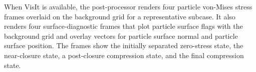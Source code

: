 When VisIt is available, the post-processor renders four particle von-Mises stress frames overlaid on the background grid for a representative subcase.  It also renders four surface-diagnostic frames that plot particle surface flags with the background grid and overlay vectors for particle surface normal and particle surface position.  The frames show the initially separated zero-stress state, the near-closure state, a post-closure compression state, and the final compression state.

